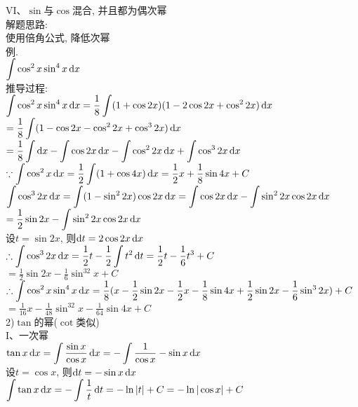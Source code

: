 VI、$\sin$与$\cos$混合, 并且都为偶次幂\\
解题思路:\\
使用倍角公式, 降低次幂\\
例.\\
\phantom{例}$\displaystyle\int\cos^2x\sin^4x\dif x$\\
推导过程:\\
$\displaystyle\int\cos^2x\sin^4x\mathop{}\!\mathrm{d} x=\frac{1}{8}\int(1+\cos2x)(1-2\cos2x+\cos^22x)\mathop{}\!\mathrm{d} x$\\
\phantom{$\displaystyle\int\cos^2x\sin^4x\dif x$}$\displaystyle=\frac{1}{8}\int(1-\cos2x-\cos^22x+\cos^32x)\mathop{}\!\mathrm{d} x$\\
\phantom{$\displaystyle\int\cos^2x\sin^4x\dif x$}$\displaystyle=\frac{1}{8}\int\mathop{}\!\mathrm{d} x-\int\cos2x\mathop{}\!\mathrm{d} x-\int\cos^22x\mathop{}\!\mathrm{d} x+\int\cos^32x\mathop{}\!\mathrm{d} x$\\
$\displaystyle\because\int\cos^2x\mathop{}\!\mathrm{d} x=\frac{1}{2}\int(1+\cos4x)\mathop{}\!\mathrm{d} x=\frac{1}{2}x+\frac{1}{8}\sin4x+C$\\
\phantom{$\displaystyle\because$}$\displaystyle\int\cos^32x\mathop{}\!\mathrm{d} x=\int(1-\sin^22x)\cos2x\mathop{}\!\mathrm{d} x=\int\cos2x\mathop{}\!\mathrm{d} x-\int\sin^22x\cos2x\mathop{}\!\mathrm{d} x$\\
\phantom{$\displaystyle\because\int\cos^32x\dif x$}$\displaystyle=\frac{1}{2}\sin2x-\int\sin^22x\cos2x\mathop{}\!\mathrm{d} x$\\
\phantom{$\displaystyle\because$}设$t=\sin2x$, 则$\mathop{}\!\mathrm{d} t=2\cos2x\mathop{}\!\mathrm{d} x$\\
$\displaystyle\therefore\int\cos^32x\mathop{}\!\mathrm{d} x=\frac{1}{2}t-\frac{1}{2}\int t^2\mathop{}\!\mathrm{d} t=\frac{1}{2}t-\frac{1}{6}t^3+C$\\
\phantom{$\displaystyle\therefore\int\cos^32x\dif x$}$\displaystyle=\frac{1}{2}\sin2x-\frac{1}{6}\sin^32x+C$\\
$\displaystyle\therefore\int\cos^2x\sin^4x\mathop{}\!\mathrm{d} x=\frac{1}{8}(x-\frac{1}{2}\sin2x-\frac{1}{2}x-\frac{1}{8}\sin4x+\frac{1}{2}\sin2x-\frac{1}{6}\sin^32x)+C$\\
\phantom{$\displaystyle\therefore\int\cos^2x\sin^4x\dif x$}$\displaystyle=\frac{1}{16}x-\frac{1}{48}\sin^32x-\frac{1}{64}\sin4x+C$\\

2)$\tan$的幂($\cot$类似)\\
I、一次幂\\
$\displaystyle\tan x\mathop{}\!\mathrm{d} x=\int\frac{\sin x}{\cos x}\mathop{}\!\mathrm{d} x=-\int\frac{1}{\cos x}-\sin x\mathop{}\!\mathrm{d} x$\\
设$t=\cos x$, 则$\mathop{}\!\mathrm{d} t=-\sin x\mathop{}\!\mathrm{d} x$\\
$\displaystyle\int\tan x\mathop{}\!\mathrm{d} x=-\int\frac{1}{t}\mathop{}\!\mathrm{d} t=-\ln|t|+C=-\ln|\cos x|+C$\\

